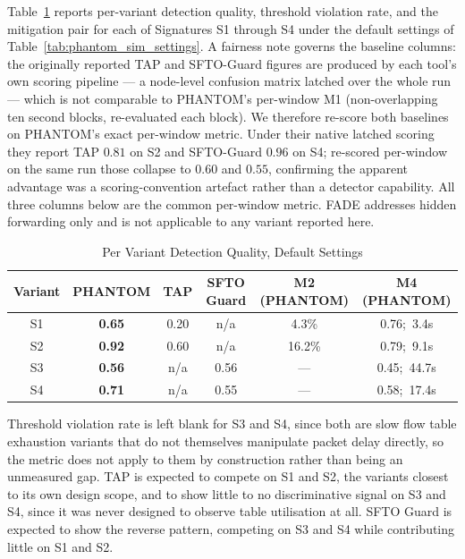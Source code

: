 \documentclass[final,5p,twocolumn]{elsarticle}
\theoremstyle{remark}
\theoremstyle{plain}
\begin{document}
Table~\ref{tab:exp5_variant} reports per-variant detection quality, threshold
violation rate, and the mitigation pair for each of Signatures S1 through S4
under the default settings of Table~\ref{tab:phantom_sim_settings}. A fairness
note governs the baseline columns: the originally reported TAP and SFTO-Guard
figures are produced by each tool's own scoring pipeline --- a node-level
confusion matrix latched over the whole run --- which is not comparable to
PHANTOM's per-window M1 (non-overlapping ten second blocks, re-evaluated each
block). We therefore re-score both baselines on PHANTOM's exact per-window
metric. Under their native latched scoring they report TAP $0.81$ on S2 and
SFTO-Guard $0.96$ on S4; re-scored per-window on the same run those collapse to
$0.60$ and $0.55$, confirming the apparent advantage was a scoring-convention
artefact rather than a detector capability. All three columns below are the
common per-window metric. FADE addresses hidden forwarding only and is not
applicable to any variant reported here.
\begin{table}[!t]
	\centering
	\caption{Per Variant Detection Quality, Default Settings}
	\label{tab:exp5_variant}
	\renewcommand{\arraystretch}{1.15}
	\footnotesize
	\begin{tabular}{|c|c|c|c|c|c|}
		\hline
		\textbf{Variant} & \textbf{PHANTOM} & \textbf{TAP} & \textbf{SFTO Guard} & \textbf{M2 (PHANTOM)} & \textbf{M4 (PHANTOM)} \\
		\hline
		S1 & \textbf{0.65} & 0.20 & n/a & 4.3\% & 0.76;\ 3.4s \\
		\hline
		S2 & \textbf{0.92} & 0.60 & n/a & 16.2\% & 0.79;\ 9.1s \\
		\hline
		S3 & \textbf{0.56} & n/a & 0.56 & --- & 0.45;\ 44.7s \\
		\hline
		S4 & \textbf{0.71} & n/a & 0.55 & --- & 0.58;\ 17.4s \\
		\hline
	\end{tabular}
\end{table}
Threshold violation rate is left blank for S3 and S4, since both are slow
flow table exhaustion variants that do not themselves manipulate packet
delay directly, so the metric does not apply to them by construction rather
than being an unmeasured gap. TAP is expected to compete on S1 and S2, the
variants closest to its own design scope, and to show little to no
discriminative signal on S3 and S4, since it was never designed to observe
table utilisation at all. SFTO Guard is expected to show the reverse
pattern, competing on S3 and S4 while contributing little on S1 and S2.
\end{document}
